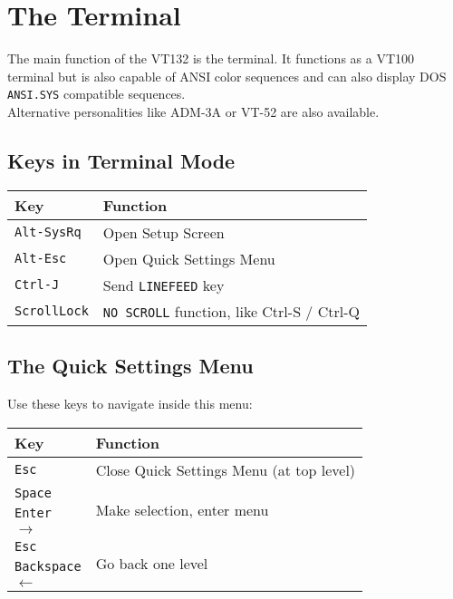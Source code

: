 \chapter{The Terminal}

The main function of the VT132 is the terminal. It functions as a VT100 terminal but is also capable of
ANSI color sequences and can also display DOS \texttt{ANSI.SYS} compatible sequences.\\
Alternative personalities like ADM-3A or VT-52 are also available.

\section{Keys in Terminal Mode}

\begin{tabular}{p{6em} | p{}}
\hline
\textbf{Key} & \textbf{Function} \\
\hline
\texttt{Alt-SysRq}	& Open Setup Screen \\
\texttt{Alt-Esc}	& Open Quick Settings Menu \\
\texttt{Ctrl-J}		& Send \texttt{LINEFEED} key \\
\texttt{ScrollLock}	& \texttt{NO SCROLL} function, like Ctrl-S / Ctrl-Q \\
\hline
\end{tabular}

\section{The Quick Settings Menu}
\label{quicksettings}

Use these keys to navigate inside this menu:

\begin{tabular}{p{6em} | p{}}
\hline
\textbf{Key} & \textbf{Function} \\
\hline
\texttt{Esc}    & Close Quick Settings Menu (at top level)\\
\hline
\texttt{Space}  & \multirow{3}{*}{Make selection, enter menu} \\
\texttt{Enter}  & \\
\texttt{$\rightarrow$}  & \\
\hline
\texttt{Esc}    & \multirow{3}{*}{Go back one level} \\
\texttt{Backspace} & \\
\texttt{$\leftarrow$}   & \\
\hline
\end{tabular}

